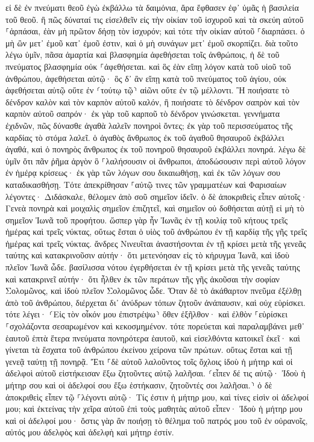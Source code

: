 \documentclass[twoside, 9pt]{extreport}
\begin{document}
εἰ δὲ ἐν πνεύματι θεοῦ ἐγὼ ἐκβάλλω τὰ δαιμόνια, ἄρα ἔφθασεν ἐφ᾽ ὑμᾶς ἡ βασιλεία τοῦ θεοῦ. 
ἢ πῶς δύναταί τις εἰσελθεῖν εἰς τὴν οἰκίαν τοῦ ἰσχυροῦ καὶ τὰ σκεύη αὐτοῦ ⸀ἁρπάσαι, ἐὰν μὴ πρῶτον δήσῃ τὸν ἰσχυρόν; καὶ τότε τὴν οἰκίαν αὐτοῦ ⸀διαρπάσει. 
ὁ μὴ ὢν μετ᾽ ἐμοῦ κατ᾽ ἐμοῦ ἐστιν, καὶ ὁ μὴ συνάγων μετ᾽ ἐμοῦ σκορπίζει. 
διὰ τοῦτο λέγω ὑμῖν, πᾶσα ἁμαρτία καὶ βλασφημία ἀφεθήσεται τοῖς ἀνθρώποις, ἡ δὲ τοῦ πνεύματος βλασφημία οὐκ ⸀ἀφεθήσεται. 
καὶ ὃς ἐὰν εἴπῃ λόγον κατὰ τοῦ υἱοῦ τοῦ ἀνθρώπου, ἀφεθήσεται αὐτῷ· ὃς δ᾽ ἂν εἴπῃ κατὰ τοῦ πνεύματος τοῦ ἁγίου, οὐκ ἀφεθήσεται αὐτῷ οὔτε ἐν ⸂τούτῳ τῷ⸃ αἰῶνι οὔτε ἐν τῷ μέλλοντι. 
Ἢ ποιήσατε τὸ δένδρον καλὸν καὶ τὸν καρπὸν αὐτοῦ καλόν, ἢ ποιήσατε τὸ δένδρον σαπρὸν καὶ τὸν καρπὸν αὐτοῦ σαπρόν· ἐκ γὰρ τοῦ καρποῦ τὸ δένδρον γινώσκεται. 
γεννήματα ἐχιδνῶν, πῶς δύνασθε ἀγαθὰ λαλεῖν πονηροὶ ὄντες; ἐκ γὰρ τοῦ περισσεύματος τῆς καρδίας τὸ στόμα λαλεῖ. 
ὁ ἀγαθὸς ἄνθρωπος ἐκ τοῦ ἀγαθοῦ θησαυροῦ ἐκβάλλει ἀγαθά, καὶ ὁ πονηρὸς ἄνθρωπος ἐκ τοῦ πονηροῦ θησαυροῦ ἐκβάλλει πονηρά. 
λέγω δὲ ὑμῖν ὅτι πᾶν ῥῆμα ἀργὸν ὃ ⸀λαλήσουσιν οἱ ἄνθρωποι, ἀποδώσουσιν περὶ αὐτοῦ λόγον ἐν ἡμέρᾳ κρίσεως· 
ἐκ γὰρ τῶν λόγων σου δικαιωθήσῃ, καὶ ἐκ τῶν λόγων σου καταδικασθήσῃ. 
Τότε ἀπεκρίθησαν ⸀αὐτῷ τινες τῶν γραμματέων καὶ Φαρισαίων λέγοντες· Διδάσκαλε, θέλομεν ἀπὸ σοῦ σημεῖον ἰδεῖν. 
ὁ δὲ ἀποκριθεὶς εἶπεν αὐτοῖς· Γενεὰ πονηρὰ καὶ μοιχαλὶς σημεῖον ἐπιζητεῖ, καὶ σημεῖον οὐ δοθήσεται αὐτῇ εἰ μὴ τὸ σημεῖον Ἰωνᾶ τοῦ προφήτου. 
ὥσπερ γὰρ ἦν Ἰωνᾶς ἐν τῇ κοιλίᾳ τοῦ κήτους τρεῖς ἡμέρας καὶ τρεῖς νύκτας, οὕτως ἔσται ὁ υἱὸς τοῦ ἀνθρώπου ἐν τῇ καρδίᾳ τῆς γῆς τρεῖς ἡμέρας καὶ τρεῖς νύκτας. 
ἄνδρες Νινευῖται ἀναστήσονται ἐν τῇ κρίσει μετὰ τῆς γενεᾶς ταύτης καὶ κατακρινοῦσιν αὐτήν· ὅτι μετενόησαν εἰς τὸ κήρυγμα Ἰωνᾶ, καὶ ἰδοὺ πλεῖον Ἰωνᾶ ὧδε. 
βασίλισσα νότου ἐγερθήσεται ἐν τῇ κρίσει μετὰ τῆς γενεᾶς ταύτης καὶ κατακρινεῖ αὐτήν· ὅτι ἦλθεν ἐκ τῶν περάτων τῆς γῆς ἀκοῦσαι τὴν σοφίαν Σολομῶνος, καὶ ἰδοὺ πλεῖον Σολομῶνος ὧδε. 
Ὅταν δὲ τὸ ἀκάθαρτον πνεῦμα ἐξέλθῃ ἀπὸ τοῦ ἀνθρώπου, διέρχεται δι᾽ ἀνύδρων τόπων ζητοῦν ἀνάπαυσιν, καὶ οὐχ εὑρίσκει. 
τότε λέγει· ⸂Εἰς τὸν οἶκόν μου ἐπιστρέψω⸃ ὅθεν ἐξῆλθον· καὶ ἐλθὸν ⸀εὑρίσκει ⸀σχολάζοντα σεσαρωμένον καὶ κεκοσμημένον. 
τότε πορεύεται καὶ παραλαμβάνει μεθ᾽ ἑαυτοῦ ἑπτὰ ἕτερα πνεύματα πονηρότερα ἑαυτοῦ, καὶ εἰσελθόντα κατοικεῖ ἐκεῖ· καὶ γίνεται τὰ ἔσχατα τοῦ ἀνθρώπου ἐκείνου χείρονα τῶν πρώτων. οὕτως ἔσται καὶ τῇ γενεᾷ ταύτῃ τῇ πονηρᾷ. 
Ἔτι ⸀δὲ αὐτοῦ λαλοῦντος τοῖς ὄχλοις ἰδοὺ ἡ μήτηρ καὶ οἱ ἀδελφοὶ αὐτοῦ εἱστήκεισαν ἔξω ζητοῦντες αὐτῷ λαλῆσαι. 
⸂εἶπεν δέ τις αὐτῷ· Ἰδοὺ ἡ μήτηρ σου καὶ οἱ ἀδελφοί σου ἔξω ἑστήκασιν, ζητοῦντές σοι λαλῆσαι.⸃ 
ὁ δὲ ἀποκριθεὶς εἶπεν τῷ ⸀λέγοντι αὐτῷ· Τίς ἐστιν ἡ μήτηρ μου, καὶ τίνες εἰσὶν οἱ ἀδελφοί μου; 
καὶ ἐκτείνας τὴν χεῖρα αὐτοῦ ἐπὶ τοὺς μαθητὰς αὐτοῦ εἶπεν· Ἰδοὺ ἡ μήτηρ μου καὶ οἱ ἀδελφοί μου· 
ὅστις γὰρ ἂν ποιήσῃ τὸ θέλημα τοῦ πατρός μου τοῦ ἐν οὐρανοῖς, αὐτός μου ἀδελφὸς καὶ ἀδελφὴ καὶ μήτηρ ἐστίν. 
\end{document}
